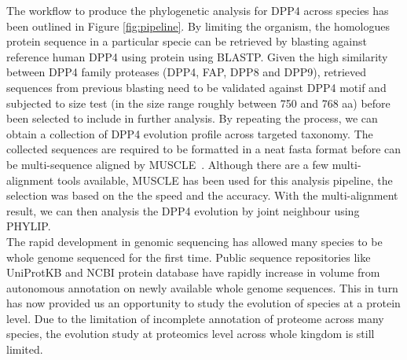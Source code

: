 The workflow to produce the phylogenetic analysis for DPP4 across species has been outlined in Figure \ref{fig:pipeline}. By limiting the organism, the homologues protein sequence in a particular specie can be retrieved by blasting against reference human DPP4 using protein using BLASTP. Given the high similarity between DPP4 family proteases (DPP4, FAP, DPP8 and DPP9), retrieved sequences from previous blasting need to be validated against DPP4 motif and subjected to size test (in the size range roughly between 750 and 768 aa) before been selected to include in further analysis. By repeating the process, we can obtain a collection of DPP4 evolution profile across targeted taxonomy. The collected sequences are required to be formatted in a neat fasta format before can be multi-sequence aligned by MUSCLE~\cite{15318951}. Although there are a few multi-alignment tools available, MUSCLE has been used for this analysis pipeline, the selection was based on the the speed and the accuracy. With the multi-alignment result, we can then analysis the DPP4 evolution by joint neighbour using PHYLIP. \\

The rapid development in genomic sequencing has allowed many species to be whole genome sequenced for the first time. Public sequence repositories like UniProtKB and NCBI protein database have rapidly increase in volume from autonomous annotation on newly available whole genome sequences. This in turn has now provided us an opportunity to study the evolution of species at a protein level.  Due to the limitation of incomplete annotation of proteome across many species, the evolution study at proteomics level across whole kingdom is still limited. 